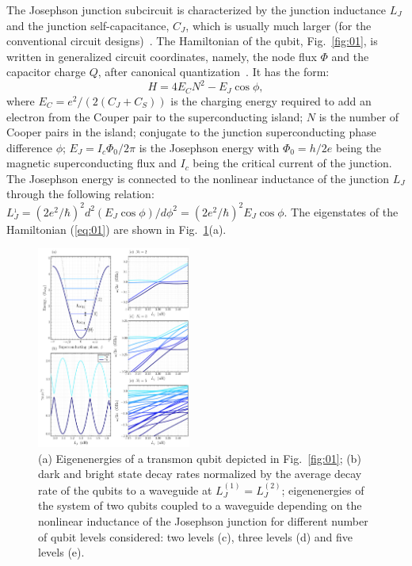 \documentclass[lettersize,journal]{IEEEtran}
\begin{document}
The Josephson junction subcircuit is characterized by the junction inductance $L_J$ and the junction self-capacitance, $C_J$, which is usually much larger (for the conventional circuit designs)~\cite{krantz_quantum_2019}.
The Hamiltonian of the qubit, Fig.~\ref{fig:01}, is written in generalized circuit coordinates, namely, the node flux $\Phi$ and the capacitor charge $Q$, after canonical quantization~\cite{}.
It has the form:
\begin{equation}\label{eq:01}
    H = 4 E_C N^2 - E_J \cos \phi,
\end{equation}
where $E_C = e^2 / (2 (C_J + C_S))$ is the charging energy required to add an electron from the Couper pair to the superconducting island; $N$ is the number of Cooper pairs in the island; conjugate to the junction superconducting phase difference $\phi$; $E_J = I_c \Phi_0 / 2\pi$ is the Josephson energy with $\Phi_0 = h / 2e$ being the magnetic superconducting flux and $I_c$ being the critical current of the junction.
The Josephson energy is connected to the nonlinear inductance of the junction $L_J$ through the following relation: $L_J^{_1} = (2e^2 / \hbar)^2 d^2(E_J \cos \phi) / d\phi^2 = (2e^2 / \hbar)^2 E_J \cos \phi$. 
The eigenstates of the Hamiltonian (\ref{eq:01}) are shown in Fig.~\ref{fig:02}(a).

\begin{figure}[h]
    \centering
    \includegraphics[width=0.45\textwidth]{fig_2}
    \caption{(a) Eigenenergies of a transmon qubit depicted in Fig.~\ref{fig:01}; (b) dark and bright state decay rates normalized by the average decay rate of the qubits to a waveguide at $L_J^{(1)} = L_J^{(2)}$; eigenenergies of the system of two qubits coupled to a waveguide depending on the nonlinear inductance of the Josephson junction for different number of qubit levels considered: two levels (c), three levels (d) and five levels (e).}
    \label{fig:02}
\end{figure}
\end{document}
